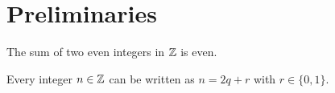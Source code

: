 \section{Preliminaries}

\begin{proposition}\label{prop:even}
The sum of two even integers in $\mathbb{Z}$ is even.
\end{proposition}

\begin{theorem}\label{thm:prelim}
Every integer $n \in \mathbb{Z}$ can be written as $n = 2q + r$ with $r \in \{0, 1\}$.
\end{theorem}
